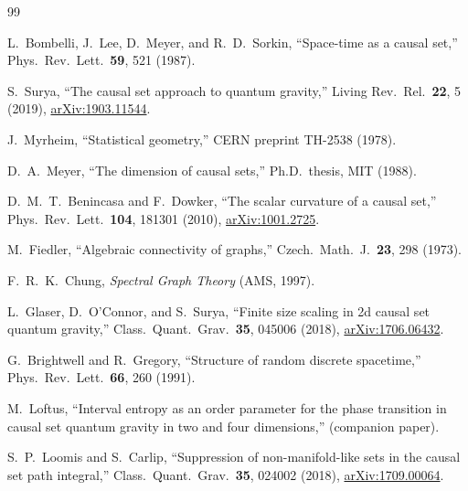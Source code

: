 \documentclass[aps,prd,twocolumn,superscriptaddress,nofootinbib]{revtex4-2}
\begin{document}
\begin{thebibliography}{99}

L.~Bombelli, J.~Lee, D.~Meyer, and R.~D.~Sorkin,
``Space-time as a causal set,''
Phys.\ Rev.\ Lett.\ \textbf{59}, 521 (1987).

S.~Surya,
``The causal set approach to quantum gravity,''
Living Rev.\ Rel.\ \textbf{22}, 5 (2019),
\href{https://arxiv.org/abs/1903.11544}{arXiv:1903.11544}.

J.~Myrheim,
``Statistical geometry,''
CERN preprint TH-2538 (1978).

D.~A.~Meyer,
``The dimension of causal sets,''
Ph.D.\ thesis, MIT (1988).

D.~M.~T.~Benincasa and F.~Dowker,
``The scalar curvature of a causal set,''
Phys.\ Rev.\ Lett.\ \textbf{104}, 181301 (2010),
\href{https://arxiv.org/abs/1001.2725}{arXiv:1001.2725}.

M.~Fiedler,
``Algebraic connectivity of graphs,''
Czech.\ Math.\ J.\ \textbf{23}, 298 (1973).

F.~R.~K.~Chung,
\emph{Spectral Graph Theory} (AMS, 1997).

L.~Glaser, D.~O'Connor, and S.~Surya,
``Finite size scaling in 2d causal set quantum gravity,''
Class.\ Quant.\ Grav.\ \textbf{35}, 045006 (2018),
\href{https://arxiv.org/abs/1706.06432}{arXiv:1706.06432}.

G.~Brightwell and R.~Gregory,
``Structure of random discrete spacetime,''
Phys.\ Rev.\ Lett.\ \textbf{66}, 260 (1991).

M.~Loftus,
``Interval entropy as an order parameter for the phase transition in causal set quantum gravity in two and four dimensions,''
(companion paper).

S.~P.~Loomis and S.~Carlip,
``Suppression of non-manifold-like sets in the causal set path integral,''
Class.\ Quant.\ Grav.\ \textbf{35}, 024002 (2018),
\href{https://arxiv.org/abs/1709.00064}{arXiv:1709.00064}.

\end{thebibliography}
\end{document}
